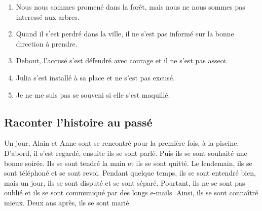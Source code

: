 \begin{enumerate}
    \item Nous nous sommes promené dans la forêt, mais nous ne nous sommes pas interessé aux arbres.
    \item Quand il s'est perdré dans la ville, il ne s'est pas informé sur la bonne direction à prendre.
    \item Debout, l'accusé s'est défendré avec courage et il ne s'est pas asseoi.
    \item Julia s'est installé à sa place et ne s'est pas excusé.
    \item Je ne me suis pas se souveni si elle s'est maquillé.
\end{enumerate}

\subsection{Raconter l'histoire au passé}

Un jour, Alain et Anne sont se rencontré pour la première fois, à la piscine. D'abord, il s'est regardé, 
ensuite ils se sont parlé. Puis ils se sont souhaité une bonne soirée. Ils se sont tendré la main et ils se sont quitté.
Le lendemain, ils se sont téléphoné et se sont revoi. Pendant quelque temps, ils se sont entendré bien, mais un jour, ils
se sont disputé et se sont séparé. Pourtant, ils ne se sont pas oublié et ils se sont communiqué par des longs e-mails.
Ainsi, ils se sont connaîtré mieux. Deux ans après, ils se sont marié.
